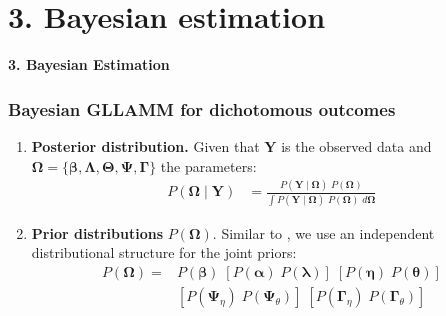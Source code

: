 \documentclass[arial,12pt,xcolor=dvipsnames]{beamer}
\begin{document}
\section{3. Bayesian estimation}
%
\begin{frame}
	\textbf{3. Bayesian Estimation}
\end{frame}
%
\begin{frame}
	\frametitle{Bayesian GLLAMM for dichotomous outcomes}
	\begin{enumerate}
		\item \textbf{Posterior distribution.}
		Given that $\mathbf{Y}$ is the observed data and $\pmb{\Omega} = \{ \pmb{\beta}, \pmb{\Lambda}, \pmb{\Theta}, \pmb{\Psi}, \pmb{\Gamma} \}$ the parameters:
		\begin{equation} \label{eq:posterior1}
			\begin{split}
				P(\pmb{\Omega} \; | \; \mathbf{Y}) &= \frac{ P( \mathbf{Y} \; | \; \pmb{\Omega} ) \; P( \pmb{\Omega} ) }{ \int P( \mathbf{Y} \; | \; \pmb{\Omega} ) \; P( \pmb{\Omega} ) \; d\pmb{\Omega} }
			\end{split}
		\end{equation}
		\item \textbf{Prior distributions} $P(\pmb{\Omega})$.
		Similar to \citet{Patz_et_al_1999}, we use an independent distributional structure for the joint priors:
		\begin{equation}
			\begin{split}
				P( \pmb{\Omega} ) =& P( \pmb{\beta} ) \; \left[ P( \pmb{\alpha} ) \; P( \pmb{\lambda} ) \right] \; \left[ P( \pmb{\eta} ) \; P( \pmb{\theta} ) \right] \\
				& \left[ P( \pmb{\Psi}_{\eta} ) \; P( \pmb{\Psi}_{\theta} ) \right] \; \left[ P( \pmb{\Gamma}_{\eta} ) \; P( \pmb{\Gamma}_{\theta} ) \right]
			\end{split}
		\end{equation}
	\end{enumerate}
\end{frame}
%
\end{document}
